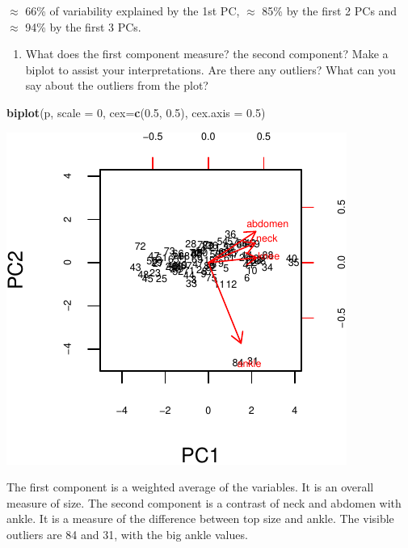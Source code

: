 \documentclass[]{article}
\newenvironment{Shaded}{\begin{snugshade}}{\end{snugshade}}
\newcommand{\DataTypeTok}[1]{\textcolor[rgb]{0.13,0.29,0.53}{#1}}
\newcommand{\DecValTok}[1]{\textcolor[rgb]{0.00,0.00,0.81}{#1}}
\newcommand{\FloatTok}[1]{\textcolor[rgb]{0.00,0.00,0.81}{#1}}
\newcommand{\KeywordTok}[1]{\textcolor[rgb]{0.13,0.29,0.53}{\textbf{#1}}}
\newcommand{\NormalTok}[1]{#1}
\providecommand{\tightlist}{%
  \setlength{\itemsep}{0pt}\setlength{\parskip}{0pt}}
\begin{document}
\(\approx\) 66\% of variability explained by the 1st PC, \(\approx\)
85\% by the first 2 PCs and \(\approx\) 94\% by the first 3 PCs.

\begin{enumerate}
\def\labelenumi{(\alph{enumi})}
\setcounter{enumi}{2}
\tightlist
\item
  What does the first component measure? the second component? Make a
  biplot to assist your interpretations. Are there any outliers? What
  can you say about the outliers from the plot?
\end{enumerate}

\begin{Shaded}
\begin{Highlighting}[]
\KeywordTok{biplot}\NormalTok{(p, }\DataTypeTok{scale =} \DecValTok{0}\NormalTok{, }\DataTypeTok{cex=}\KeywordTok{c}\NormalTok{(}\FloatTok{0.5}\NormalTok{, }\FloatTok{0.5}\NormalTok{), }\DataTypeTok{cex.axis =} \FloatTok{0.5}\NormalTok{)}
\end{Highlighting}
\end{Shaded}

\begin{center}\includegraphics{sol_A2_files/figure-latex/unnamed-chunk-11-1} \end{center}

The first component is a weighted average of the variables. It is an
overall measure of size. The second component is a contrast of neck and
abdomen with ankle. It is a measure of the difference between top size
and ankle. The visible outliers are 84 and 31, with the big ankle
values.
\end{document}
